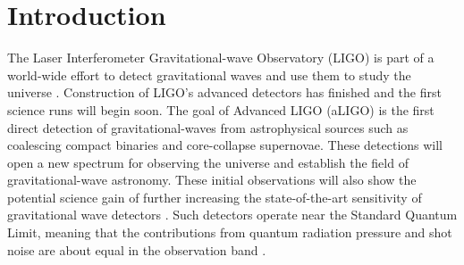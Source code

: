 \section{Introduction}

%
%


The Laser Interferometer Gravitational-wave Observatory (LIGO) is part of a world-wide 
effort to detect gravitational waves and use them to study the universe \cite{BPAbbott09}. Construction of 
LIGO's advanced detectors has finished and the first science runs will begin soon. The goal of Advanced LIGO (aLIGO) is the first direct detection of gravitational-waves 
from astrophysical sources such as coalescing compact binaries and core-collapse supernovae.
These detections will open a new spectrum for observing the universe and establish the field of 
gravitational-wave astronomy. 
These initial observations will also show the potential science gain of further increasing the state-of-the-art sensitivity of gravitational wave detectors \cite{Smith09,Harry10,Losurdo12}. Such detectors operate near the Standard Quantum Limit, meaning that the contributions from quantum radiation pressure and shot noise are about equal in the observation band \cite{Caves80, Ni86}.

